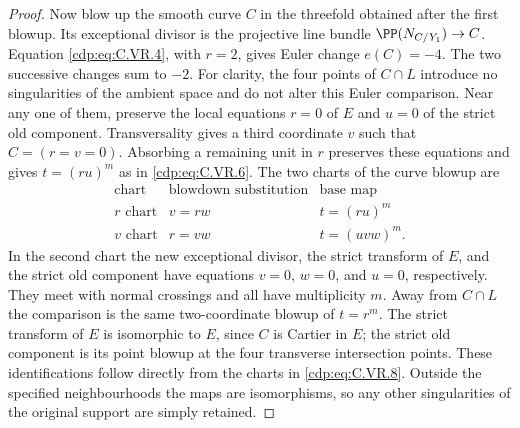 \begin{proof}
Now blow up the smooth curve $C$ in the threefold obtained after the
first blowup. Its exceptional divisor is the projective line bundle
$\PP(N_{C/Y_1})\to C$. Equation \eqref{cdp:eq:C.VR.4}, with $r=2$, gives Euler
change $e(C)=-4$. The two successive changes sum to $-2$.
For clarity, the four points of $C\cap L$ introduce no singularities
of the ambient space and do not alter this Euler comparison. Near any
one of them, preserve the local equations $r=0$ of $E$ and $u=0$ of
the strict old component. Transversality gives a third coordinate $v$
such that $C=(r=v=0)$. Absorbing a remaining unit in $r$ preserves
these equations and gives $t=(ru)^m$ as in \eqref{cdp:eq:C.VR.6}. The two charts of
the curve blowup are
\[
 \begin{array}{c|c|c}
 \text{chart}&\text{blowdown substitution}&\text{base map}\\ \hline
 \text{$r$ chart}&v=rw&t=(ru)^m\\
 \text{$v$ chart}&r=vw&t=(uvw)^m .
 \end{array}                                      \tag{C.VR.8}\label{cdp:eq:C.VR.8}
\]
In the second chart the new exceptional divisor, the strict transform
of $E$, and the strict old component have equations $v=0$, $w=0$,
and $u=0$, respectively. They meet with normal crossings and all
have multiplicity $m$. Away from $C\cap L$ the comparison is the
same two-coordinate blowup of $t=r^m$. The strict transform of $E$
is isomorphic to $E$, since $C$ is Cartier in $E$; the strict old
component is its point blowup at the four transverse intersection
points. These identifications follow directly from the charts in
\eqref{cdp:eq:C.VR.8}. Outside the specified neighbourhoods the maps are
isomorphisms, so any other singularities of the original support
are simply retained.


\end{proof}
